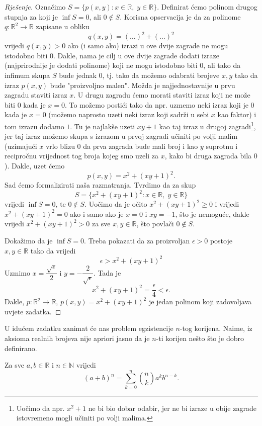 \begin{proof}[Rješenje]
Označimo \(S=\{p(x, y) : x\in \mathbb{R},\; y\in \mathbb{R}\}\). Definirat ćemo polinom drugog stupnja za koji je \(\inf{S}=0\), ali \(0\notin S\). Korisna opservacija je da za polinome \(q : \mathbb{R}^2\to \mathbb{R}\) zapisane u obliku
\[q(x, y)=(\dots)^2+(\dots)^2\]
vrijedi \(q(x, y)>0\) ako (i samo ako) izrazi u ove dvije zagrade ne mogu istodobno biti \(0\). Dakle, nama je cilj u ove dvije zagrade dodati izraze (najprirodnije je dodati polinome) koji ne mogu istodobno biti \(0\), ali tako da infimum skupa \(S\) bude jednak \(0\), tj. tako da možemo odabrati brojeve \(x, y\) tako da izraz \(p(x, y)\) bude "proizvoljno malen". Možda je najjednostavnije u prvu zagradu staviti izraz \(x\). U drugu zagradu ćemo morati staviti izraz koji ne može biti \(0\) kada je \(x=0\). To možemo postići tako da npr. uzmemo neki izraz koji je \(0\) kada je \(x=0\) (možemo naprosto uzeti neki izraz koji sadrži u sebi \(x\) kao faktor) i tom izrazu dodamo \(1\). Tu je najlakše uzeti \(xy+1\) kao taj izraz u drugoj zagradi\footnote{Uočimo da npr. \(x^2+1\) ne bi bio dobar odabir, jer ne bi izraze u obije zagrade istovremeno mogli učiniti po volji malima.}, jer taj izraz možemo skupa s izrazom u prvoj zagradi učiniti po volji malim (uzimajući \(x\) vrlo blizu \(0\) da prva zagrada bude mali broj i kao \(y\) suprotnu i recipročnu vrijednost tog broja kojeg smo uzeli za \(x\), kako bi druga zagrada bila \(0\)). Dakle, uzet ćemo
\[p(x, y)=x^2+(xy+1)^2.\]
Sad ćemo formalizirati naša razmatranja. Tvrdimo da za skup
\[S=\{x^2+(xy+1)^2 : x\in \mathbb{R},\; y\in \mathbb{R}\}\]
vrijedi \(\inf{S}=0\), te \(0\notin S\). Uočimo da je očito \(x^2+(xy+1)^2\geq 0\) i vrijedi \(x^2+(xy+1)^2=0\) ako i samo ako je \(x=0\) i \(xy=-1\), što je nemoguće, dakle vrijedi \(x^2+(xy+1)^2>0\) za sve \(x, y\in \mathbb{R}\), što povlači \(0\notin S\).

Dokažimo da je \(\inf{S}=0\). Treba pokazati da za proizvoljan \(\epsilon>0\) postoje \(x, y\in \mathbb{R}\) tako da vrijedi
\[\epsilon> x^2+(xy+1)^2\]
Uzmimo \(x=\dfrac{\sqrt{\epsilon}}{2}\) i \(y=-\dfrac{2}{\sqrt{\epsilon}}\). Tada je
\[x^2+(xy+1)^2=\dfrac{\epsilon}{4}<\epsilon.\]
Dakle, \(p : \mathbb{R}^2\to \mathbb{R}\), \(p(x, y)=x^2+(xy+1)^2\) je jedan polinom koji zadovoljava uvjete zadatka.
\end{proof}
U idućem zadatku zanimat će nas problem egzistencije $n$-tog korijena. Naime, iz aksioma realnih brojeva nije apriori jasno da je $n$-ti korijen nešto što je dobro definirano.
\begin{remark}
\label{bintm}
Za sve \(a, b\in \mathbb{R}\) i \(n\in \mathbb{N}\) vrijedi
\[(a+b)^n=\sum\limits_{k=0}^n{\binom{n}{k}a^kb^{n-k}}.\]
\end{remark}
